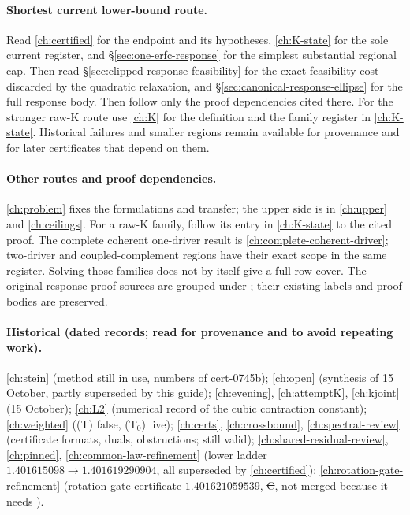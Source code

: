 \paragraph{Shortest current lower-bound route.}
Read \autoref{ch:certified} for the endpoint and its hypotheses,
\autoref{ch:K-state} for the sole current register, and
\S\ref{sec:one-erfc-response} for the simplest substantial regional cap.
Then read \S\ref{sec:clipped-response-feasibility} for the exact
feasibility cost discarded by the quadratic relaxation, and
\S\ref{sec:canonical-response-ellipse} for the full response body. Then follow only the
proof dependencies cited there. For the stronger raw-K route use
\autoref{ch:K} for the definition and the family register in
\autoref{ch:K-state}. Historical failures and smaller regions remain
available for provenance and for later certificates that depend on them.

\paragraph{Other routes and proof dependencies.}
\autoref{ch:problem} fixes the formulations and transfer; the upper side
is in \autoref{ch:upper} and \autoref{ch:ceilings}. For a raw-K family,
follow its entry in \autoref{ch:K-state} to the cited proof. The complete
coherent one-driver result is \autoref{ch:complete-coherent-driver};
two-driver and coupled-complement regions have their exact scope in the
same register. Solving those families does not by itself give a full row
cover. The original-response proof sources are grouped under
; their existing labels and proof bodies are preserved.

\paragraph{Historical (dated records; read for provenance and to avoid repeating work).} \autoref{ch:stein} (method still in use, numbers of
cert-0745b); \autoref{ch:open} (synthesis of 15 October, partly superseded by this guide); \autoref{ch:evening}, \autoref{ch:attemptK}, \autoref{ch:kjoint}
(15 October); \autoref{ch:L2} (numerical record of the cubic contraction constant); \autoref{ch:weighted} ((T) false, (T$_0$) live);
\autoref{ch:certs}, \autoref{ch:crossbound}, \autoref{ch:spectral-review} (certificate formats, duals, obstructions; still valid); \autoref{ch:shared-residual-review},
\autoref{ch:pinned}, \autoref{ch:common-law-refinement} (lower ladder $1.401615098\to1.401619290904$, all superseded by \autoref{ch:certified});
\autoref{ch:rotation-gate-refinement} (rotation-gate certificate $1.401621059539$, \st{C}, not merged because it needs ).

